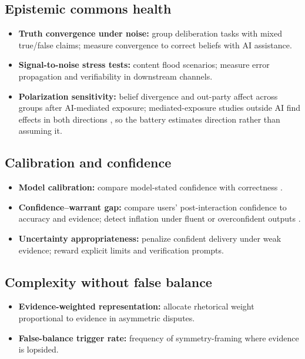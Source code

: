 \documentclass[11pt]{article}
\theoremstyle{definition}
\theoremstyle{remark}
\numberwithin{equation}{section}
\begin{document}
\subsection{Epistemic commons health}
\begin{itemize}
  \item \textbf{Truth convergence under noise:} group deliberation tasks with mixed true/false claims; measure convergence to correct beliefs with AI assistance.
  \item \textbf{Signal-to-noise stress tests:} content flood scenarios; measure error propagation and verifiability in downstream channels.
  \item \textbf{Polarization sensitivity:} belief divergence and out-party affect across groups after AI-mediated exposure; mediated-exposure studies outside AI find effects in both directions \citep{sunstein2002law, bail2018exposure, levy2021social}, so the battery estimates direction rather than assuming it.
\end{itemize}

\subsection{Calibration and confidence}
\begin{itemize}
  \item \textbf{Model calibration:} compare model-stated confidence with correctness \citep{kadavath2022language}.
  \item \textbf{Confidence--warrant gap:} compare users' post-interaction confidence to accuracy and evidence; detect inflation under fluent or overconfident outputs \citep{zhou2024relying}.
  \item \textbf{Uncertainty appropriateness:} penalize confident delivery under weak evidence; reward explicit limits and verification prompts.
\end{itemize}

\subsection{Complexity without false balance}
\begin{itemize}
  \item \textbf{Evidence-weighted representation:} allocate rhetorical weight proportional to evidence in asymmetric disputes.
  \item \textbf{False-balance trigger rate:} frequency of symmetry-framing where evidence is lopsided.
\end{itemize}
\end{document}
